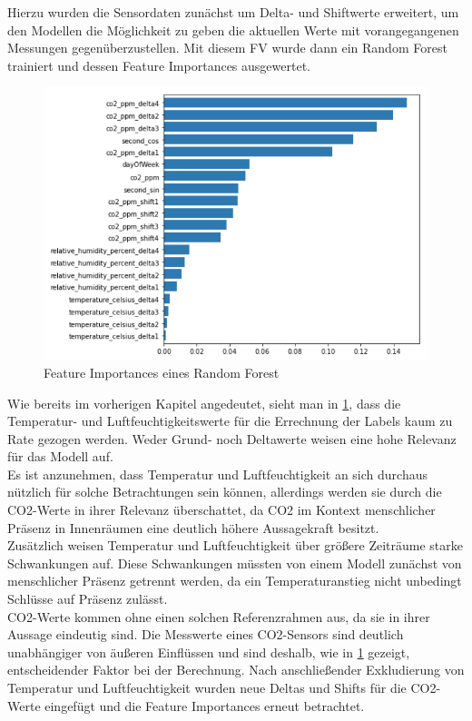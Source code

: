 Hierzu wurden die Sensordaten zunächst um Delta- und Shiftwerte erweitert, um den Modellen die Möglichkeit zu geben
die aktuellen Werte mit vorangegangenen Messungen gegenüberzustellen. Mit diesem FV wurde dann ein Random Forest
trainiert und dessen Feature Importances ausgewertet.

\newpage
\begin{figure}[h]
    \centering
    \includegraphics[width=1.0\textwidth]{pic/feature_importances.png}
    \caption{Feature Importances eines Random Forest}
    \label{fig:FI}
\end{figure}

Wie bereits im vorherigen Kapitel angedeutet, sieht man in \ref{fig:FI}, dass die Temperatur- und 
Luftfeuchtigkeitswerte für die Errechnung der Labels kaum zu Rate gezogen werden. 
Weder Grund- noch Deltawerte weisen eine hohe Relevanz für das Modell auf.\\
Es ist anzunehmen, dass Temperatur und Luftfeuchtigkeit an sich durchaus nützlich für solche Betrachtungen sein
können, allerdings werden sie durch die CO2-Werte in ihrer Relevanz überschattet, da CO2 im Kontext menschlicher
Präsenz in Innenräumen eine deutlich höhere Aussagekraft besitzt.\\
Zusätzlich weisen Temperatur und Luftfeuchtigkeit über größere Zeiträume starke Schwankungen auf. Diese Schwankungen
müssten von einem Modell zunächst von menschlicher Präsenz getrennt werden, da ein Temperaturanstieg nicht unbedingt
Schlüsse auf Präsenz zulässt.\\
CO2-Werte kommen ohne einen solchen Referenzrahmen aus, da sie in ihrer Aussage eindeutig sind. Die Messwerte
eines CO2-Sensors sind deutlich unabhängiger von äußeren Einflüssen und sind deshalb, wie in \ref{fig:FI} gezeigt,
entscheidender Faktor bei der Berechnung.
\newpage
Nach anschließender Exkludierung von Temperatur und Luftfeuchtigkeit wurden neue Deltas und Shifts für die 
CO2-Werte eingefügt und die Feature Importances erneut betrachtet. 

